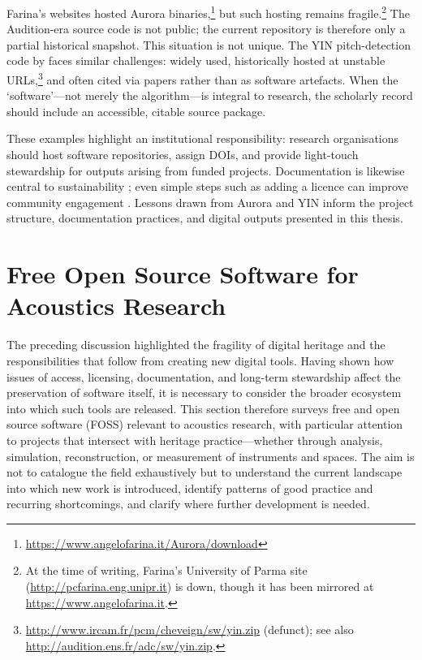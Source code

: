 Farina’s websites hosted Aurora
binaries,\footnote{\url{https://www.angelofarina.it/Aurora/download}} but such
hosting remains fragile.\footnote{At the time of writing, Farina’s University of
Parma site (\url{http://pcfarina.eng.unipr.it}) is down, though it has been
mirrored at \url{https://www.angelofarina.it}.} The Audition-era source code is
not public; the current repository is therefore only a partial historical
snapshot. This situation is not unique. The YIN pitch-detection code by
\textcite{cheveigne_yin_2002} faces similar challenges: widely used,
historically hosted at unstable
URLs,\footnote{\url{http://www.ircam.fr/pcm/cheveign/sw/yin.zip} (defunct); see
also \url{http://audition.ens.fr/adc/sw/yin.zip}.} and often cited via papers
rather than as software artefacts. When the `software'---not merely the
algorithm---is integral to research, the scholarly record should include an
accessible, citable source package.

These examples highlight an institutional responsibility: research organisations
should host software repositories, assign DOIs, and provide light-touch
stewardship for outputs arising from funded projects. Documentation is likewise
central to sustainability \cite{perkel_challenge_2020}; even simple steps such
as adding a licence can improve community engagement \cite{colazo_licence_2009}.
Lessons drawn from Aurora and YIN inform the project structure, documentation
practices, and digital outputs presented in this thesis.


\section{Free Open Source Software for Acoustics Research}\label{sec:foss-acoustics}

The preceding discussion highlighted the fragility of digital heritage and the
responsibilities that follow from creating new digital tools. Having shown how
issues of access, licensing, documentation, and long-term stewardship affect the
preservation of software itself, it is necessary to consider the broader
ecosystem into which such tools are released. This section therefore surveys
free and open source software (FOSS) relevant to acoustics research, with
particular attention to projects that intersect with heritage practice---whether
through analysis, simulation, reconstruction, or measurement of instruments and
spaces. The aim is not to catalogue the field exhaustively but to understand the
current landscape into which new work is introduced, identify patterns of good
practice and recurring shortcomings, and clarify where further development is
needed.

